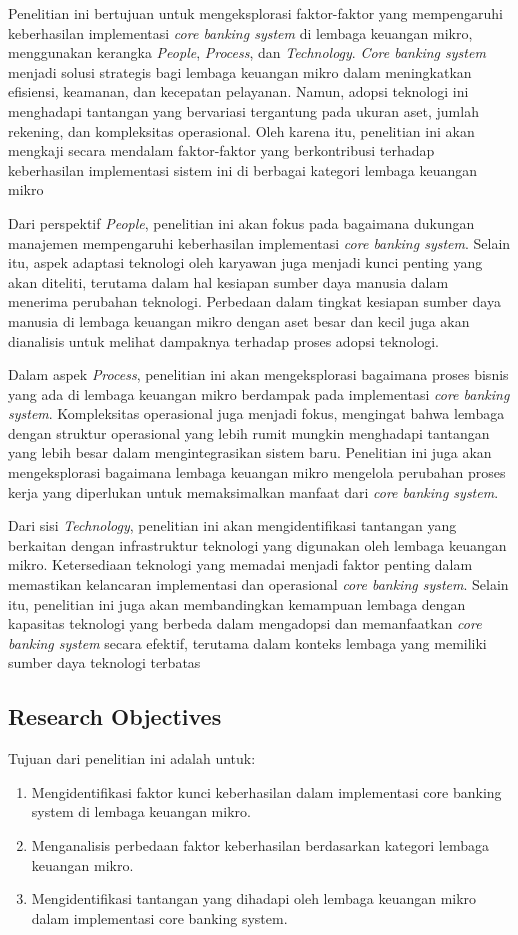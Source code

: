 \documentclass[journal,article,submit,pdftex,moreauthors]{Definitions/mdpi}
\begin{document}
Penelitian ini bertujuan untuk mengeksplorasi faktor-faktor yang mempengaruhi keberhasilan implementasi \textit{core banking system} di lembaga keuangan mikro, menggunakan kerangka \textit{People}, \textit{Process}, dan \textit{Technology}. \textit{Core banking system} menjadi solusi strategis bagi lembaga keuangan mikro dalam meningkatkan efisiensi, keamanan, dan kecepatan pelayanan. Namun, adopsi teknologi ini menghadapi tantangan yang bervariasi tergantung pada ukuran aset, jumlah rekening, dan kompleksitas operasional. Oleh karena itu, penelitian ini akan mengkaji secara mendalam faktor-faktor yang berkontribusi terhadap keberhasilan implementasi sistem ini di berbagai kategori lembaga keuangan mikro

Dari perspektif \textit{People}, penelitian ini akan fokus pada bagaimana dukungan manajemen mempengaruhi keberhasilan implementasi \textit{core banking system}. Selain itu, aspek adaptasi teknologi oleh karyawan juga menjadi kunci penting yang akan diteliti, terutama dalam hal kesiapan sumber daya manusia dalam menerima perubahan teknologi. Perbedaan dalam tingkat kesiapan sumber daya manusia di lembaga keuangan mikro dengan aset besar dan kecil juga akan dianalisis untuk melihat dampaknya terhadap proses adopsi teknologi.

Dalam aspek \textit{Process}, penelitian ini akan mengeksplorasi bagaimana proses bisnis yang ada di lembaga keuangan mikro berdampak pada implementasi \textit{core banking system}. Kompleksitas operasional juga menjadi fokus, mengingat bahwa lembaga dengan struktur operasional yang lebih rumit mungkin menghadapi tantangan yang lebih besar dalam mengintegrasikan sistem baru. Penelitian ini juga akan mengeksplorasi bagaimana lembaga keuangan mikro mengelola perubahan proses kerja yang diperlukan untuk memaksimalkan manfaat dari \textit{core banking system}.

Dari sisi \textit{Technology}, penelitian ini akan mengidentifikasi tantangan yang berkaitan dengan infrastruktur teknologi yang digunakan oleh lembaga keuangan mikro. Ketersediaan teknologi yang memadai menjadi faktor penting dalam memastikan kelancaran implementasi dan operasional \textit{core banking system}. Selain itu, penelitian ini juga akan membandingkan kemampuan lembaga dengan kapasitas teknologi yang berbeda dalam mengadopsi dan memanfaatkan \textit{core banking system} secara efektif, terutama dalam konteks lembaga yang memiliki sumber daya teknologi terbatas

\subsection{Research Objectives}
Tujuan dari penelitian ini adalah untuk:
\begin{enumerate}
    \item Mengidentifikasi faktor kunci keberhasilan dalam implementasi core banking system di lembaga keuangan mikro.
    \item Menganalisis perbedaan faktor keberhasilan berdasarkan kategori lembaga keuangan mikro.
    \item Mengidentifikasi tantangan yang dihadapi oleh lembaga keuangan mikro dalam implementasi core banking system.
\end{enumerate}
\end{document}
